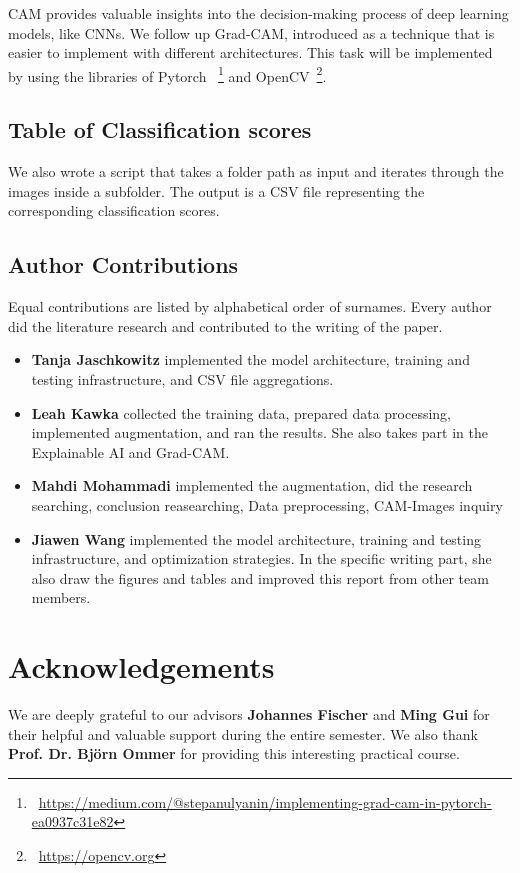 CAM provides valuable insights into the decision-making process of deep learning models, like CNNs.
We follow up Grad-CAM\cite{almeida_grad-cam_2023}, introduced as a technique that is easier to implement with different architectures.
This task will be implemented by using the libraries of Pytorch
~\footnote{~\url{https://medium.com/@stepanulyanin/implementing-grad-cam-in-pytorch-ea0937c31e82}}
and OpenCV~\footnote{~\url{https://opencv.org}}.
\subsection{Table of Classification scores}
\label{sec:optim:csv}
We also wrote a script that takes a folder path as input and iterates through the images inside a subfolder. 
The output is a CSV file representing the corresponding classification scores. 

\subsection*{Author Contributions}
\label{sec:author}
Equal contributions are listed by alphabetical order of surnames. 
Every author did the literature research and contributed to the writing of the paper. 

\begin{itemize}
  \item \textbf{Tanja Jaschkowitz} implemented the model architecture, training and testing infrastructure, and CSV file aggregations. 
  \item \textbf{Leah Kawka} collected the training data, prepared data processing, implemented augmentation, and ran the results. 
  She also takes part in the Explainable AI and Grad-CAM.
  \item \textbf{Mahdi Mohammadi} implemented the augmentation, did the research searching, conclusion reasearching, Data preprocessing, CAM-Images inquiry
  \item \textbf{Jiawen Wang} implemented the model architecture, training and testing infrastructure, and optimization strategies. 
  In the specific writing part, she also draw the figures and tables and improved this report from other team members.
\end{itemize}

\section*{Acknowledgements}

We are deeply grateful to our advisors \textbf{Johannes Fischer} and \textbf{Ming Gui} for their helpful and valuable support during the entire semester. 
We also thank \textbf{Prof. Dr. Björn Ommer} for providing this interesting practical course.

